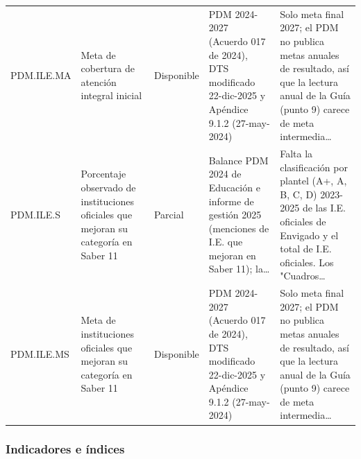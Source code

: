 \documentclass[11pt,letterpaper]{article}
\begin{document}
{\begin{xltabular}{\linewidth}{L{1.9cm}YL{1.9cm}YY}
PDM.ILE.MA & Meta de cobertura de atención integral inicial & Disponible & PDM 2024-2027 (Acuerdo 017 de 2024), DTS modificado 22-dic-2025 y Apéndice 9.1.2 (27-may-2024) & Solo meta final 2027; el PDM no publica metas anuales de resultado, así que la lectura anual de la Guía (punto 9) carece de meta intermedia\ldots{} \\
PDM.ILE.S & Porcentaje observado de instituciones oficiales que mejoran su categoría en Saber 11 & Parcial & Balance PDM 2024 de Educación e informe de gestión 2025 (menciones de I.E. que mejoran en Saber 11); la\ldots{} & Falta la clasificación por plantel (A+, A, B, C, D) 2023-2025 de las I.E. oficiales de Envigado y el total de I.E. oficiales. Los "Cuadros\ldots{} \\
PDM.ILE.MS & Meta de instituciones oficiales que mejoran su categoría en Saber 11 & Disponible & PDM 2024-2027 (Acuerdo 017 de 2024), DTS modificado 22-dic-2025 y Apéndice 9.1.2 (27-may-2024) & Solo meta final 2027; el PDM no publica metas anuales de resultado, así que la lectura anual de la Guía (punto 9) carece de meta intermedia\ldots{} \\
\end{xltabular}
}

\par{}\par

\subsubsection*{Indicadores e índices}
\end{document}
